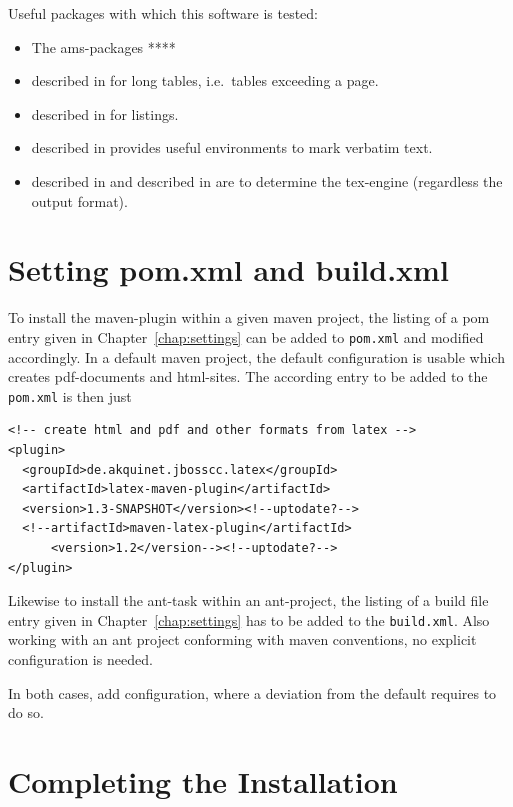 \documentclass[12pt]{book}
\newcommand{\gls}[1]{#1}
\renewcommand{\index}[1]{ }
\begin{document}
\noindent
Useful packages with which this software is tested: 
%
\begin{itemize}
\item
The ams-packages **** 
\item
{} described in \cite{LongTabP} 
for long tables, i.e.~tables exceeding a page. 
\item
{} described in \cite{ListingsP} for listings. 
\item
{} described in \cite{FancyVerbP} 
provides useful environments to mark verbatim text. 
\item
{} described in \cite{IfXeTeXP} and 
 described in \cite{IfLuaTeXP} 
are to determine the tex-engine (regardless the output format). 

\end{itemize}


\section{Setting pom.xml and build.xml}\label{sec:sgml}

To install the maven-plugin within a given maven project, 
the listing of a pom entry given in Chapter~\ref{chap:settings} 
can be added to \texttt{pom.xml} and modified accordingly. 
In a default maven project, 
the default configuration is usable which creates pdf-documents and
\gls{html}-sites. 
The according entry to be added to the \texttt{pom.xml} is then just 
%
\lstset{language=xml, basicstyle=\small}
\begin{lstlisting}
<!-- create html and pdf and other formats from latex -->
<plugin>
  <groupId>de.akquinet.jbosscc.latex</groupId>
  <artifactId>latex-maven-plugin</artifactId>
  <version>1.3-SNAPSHOT</version><!--uptodate?-->
  <!--artifactId>maven-latex-plugin</artifactId>
      <version>1.2</version--><!--uptodate?-->
</plugin>
\end{lstlisting}

Likewise to install the ant-task within an ant-project, 
the listing of a build file entry given in Chapter~\ref{chap:settings} 
has to be added to the \texttt{build.xml}. 
Also working with an ant project 
conforming with maven conventions, 
no explicit configuration is needed. 
\index{ant-task}

In both cases, add configuration, 
where a deviation from the default requires to do so. 



\section{Completing the Installation}\label{sec:instComplete}
\end{document}
